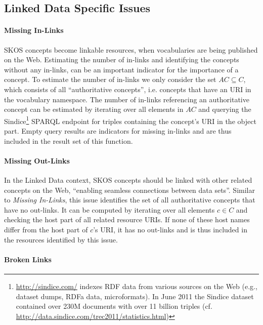 \subsection{Linked Data Specific Issues}\label{subsec:ld_issues}

\paragraph{Missing In-Links}

SKOS concepts become linkable resources, when vocabularies are being published on the Web. Estimating the number of in-links and identifying the concepts without any in-links, can be an important indicator for the importance of a concept.
To estimate the number of in-links we only consider the set $AC \subseteq C$, which consists of all ``authoritative concepts'', i.e. concepts that have an URI in the vocabulary namespace. The number of in-links referencing an authoritative concept can be estimated by iterating over all elements in $AC$ and querying the Sindice\footnote{\url{http://sindice.com/} indexes RDF data from various sources on the Web (e.g., dataset dumps, RDFa data, microformats). In June 2011 the Sindice dataset contained over 230M documents with over 11 billion triples (cf. \url{http://data.sindice.com/trec2011/statistics.html})} SPARQL endpoint for triples containing the concept's URI in the object part. Empty query results are indicators for missing in-links and are thus included in the result set of this function.

\paragraph{Missing Out-Links}

In the Linked Data context, SKOS concepts should be linked with other related concepts on the Web, ``enabling seamless connections between data sets''\cite{Heath2011}. Similar to \emph{Missing In-Links}, this issue identifies the set of all authoritative concepts that have no out-links.
It can be computed by iterating over all elements $c \in C$ and checking the host part of all related resource URIs. If none of these host names differ from the host part of $c$'s URI, it has no out-links and is thus included in the resources identified by this issue.

\paragraph{Broken Links}


